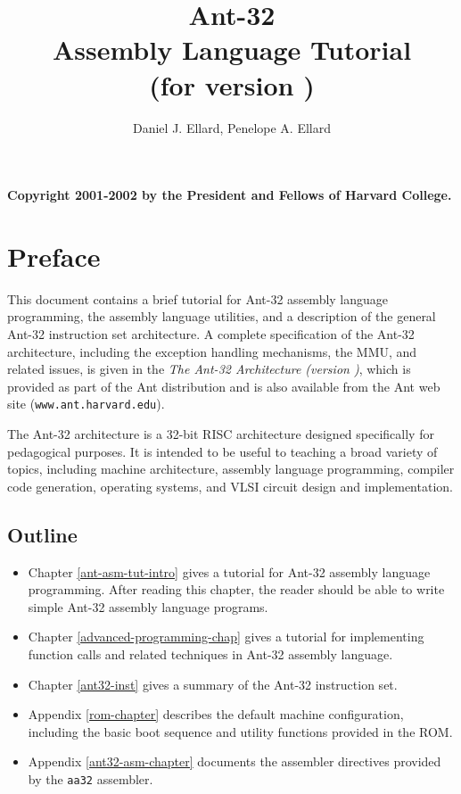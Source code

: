 \documentclass[11pt,makeidx,psfig]{book}
\title{\Huge\bf Ant-32 \\ Assembly Language Tutorial \\
		(for version ) }
\author{Daniel J. Ellard, Penelope A. Ellard}
\begin{document}
\frontmatter
\maketitle

{\bf Copyright 2001-2002 by the President and Fellows of Harvard College. }

\tableofcontents

\chapter{Preface}

This document contains a brief tutorial for Ant-32 assembly
language programming, the assembly language utilities, and a
description of the general Ant-32 instruction set architecture. 
A complete specification of the Ant-32 architecture, including the
exception handling mechanisms, the MMU, and related issues, is given
in the {\em The Ant-32 Architecture (version \antVersion)},
which is provided as part of the Ant distribution and is also
available from the Ant web site ({\tt www.ant.harvard.edu}).

The Ant-32 architecture is a 32-bit RISC architecture designed
specifically for pedagogical purposes.  It is intended to be useful to
teaching a broad variety of topics, including machine architecture,
assembly language programming, compiler code generation, operating
systems, and VLSI circuit design and implementation.

\section{Outline}

\begin{itemize}

\item Chapter \ref{ant-asm-tut-intro} gives a tutorial for
	Ant-32 assembly language programming.  After reading this
	chapter, the reader should be able to write simple
	Ant-32 assembly language programs.

\item Chapter \ref{advanced-programming-chap} gives a tutorial for
	implementing function calls and related techniques in
	Ant-32 assembly language.

\item Chapter \ref{ant32-inst} gives a summary of the Ant-32
	instruction set.

\item Appendix \ref{rom-chapter} describes the default machine
	configuration, including the basic boot sequence and utility
	functions provided in the ROM.

\item Appendix \ref{ant32-asm-chapter} documents the assembler
	directives provided by the {\tt aa32} assembler.

\end{itemize}
\end{document}
